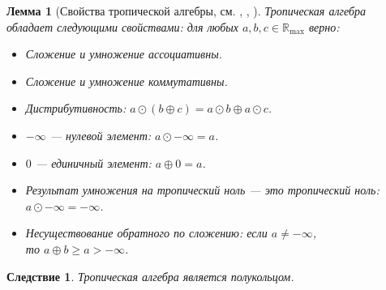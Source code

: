\documentclass[12pt]{article}
\newtheorem{lemma}[theorem]{Лемма}
\newtheorem{corollary}[theorem]{Следствие}
\begin{document}
\begin{lemma} [Свойства тропической алгебры, см. \cite{glanceOnTropicalLA}, \cite{tropicalMath}, \cite{Volchenko}] Тропическая алгебра обладает следующими свойствами: для любых $a, b, c \in \mathbb{R}_{\max}$ верно:
\begin{itemize}
	\item Сложение и умножение ассоциативны.
	\item Сложение и умножение коммутативны.
	\item Дистрибутивность: $a \odot (b \oplus c) = a \odot b \oplus a \odot c$.
	\item $-\infty$ --- нулевой элемент: $a \odot -\infty = a$.
	\item $0$ --- единичный элемент: $a \oplus 0= a$.
	\item Результат умножения на тропический ноль --- это тропический ноль: $a \odot -\infty = -\infty$.
	\item Несуществование обратного по сложению: если $a \neq -\infty$, \\то $a \oplus b \ge a > -\infty$.
\end{itemize}
\end{lemma}
\begin{corollary}
Тропическая алгебра является полукольцом.
\end{corollary}
\end{document}
